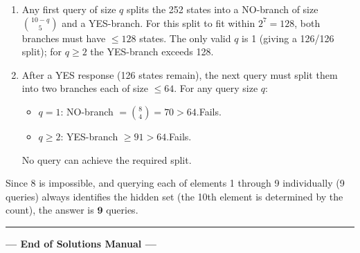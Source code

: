 \documentclass[a4paper,12pt]{article}
\begin{document}
\begin{enumerate}[nosep]
  \item Any first query of size $q$ splits the 252 states into a NO-branch of
        size $\binom{10-q}{5}$ and a YES-branch. For this split to fit within
        $2^7=128$, both branches must have $\le 128$ states. The only valid
        $q$ is 1 (giving a 126/126 split); for $q\ge 2$ the YES-branch
        exceeds 128.
  \item After a YES response (126 states remain), the next query must split
        them into two branches each of size $\le 64$. For any query size $q$:
        \begin{itemize}[nosep]
          \item $q=1$: NO-branch $= \binom{8}{4} = 70 > 64$.\quad Fails.
          \item $q\ge 2$: YES-branch $\ge 91 > 64$.\quad Fails.
        \end{itemize}
        No query can achieve the required split.
\end{enumerate}

Since 8 is impossible, and querying each of elements 1 through 9 individually
(9 queries) always identifies the hidden set (the 10th element is determined
by the count), the answer is $\mathbf{9}$ queries.

\vspace{2ex}
\hrule
\vspace{1.5ex}
\begin{center}
  \Large\bfseries --- End of Solutions Manual ---
\end{center}
\end{document}
